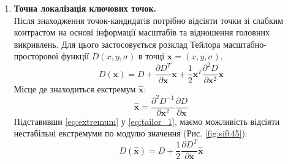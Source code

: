 \begin{enumerate}
    \item \textbf{Точна локалізація ключових точок.} \\
          Після знаходження точок-кандидатів потрібно відсіяти точки зі слабким контрастом на основі
          інформації масштабів та відношення головних викривлень. Для цього застосовується розклад
          Тейлора масштабно-просторової функції $D(x,y,\sigma)$ в точці $\textbf{x} = (x,y,\sigma)$.
          \begin{equation}
              D(\textbf{x}) = D + \frac{\partial D^T }{\partial \textbf{x} }\textbf{x} +
              \frac{1}{2}\textbf{x}^T\frac{\partial^2 D}{\partial \textbf{x}^2}\textbf{x}
              \label{eq:tailor_1}
          \end{equation}
          Місце де знаходиться екстремум $\widehat{\textbf{x}}$:
          \begin{equation}
              \widehat{\textbf{x}} = \frac{\partial^2 D^{-1} }{\partial
                  \textbf{x}^2}\frac{\partial D }{\partial \textbf{x}}
              \label{eq:extremum}
          \end{equation}
          Підставивши \ref{eq:extremum} у  \ref{eq:tailor_1}, маємо можливість відсіяти нестабільні
          екстремуми по модулю значення (Рис. \ref{fig:sift45}):
          \begin{equation}
              D(\widehat{\textbf{x}}) = D + \frac{1}{2}\frac{\partial D^{T} }{\partial \textbf{x}}\widehat{\textbf{x}}
          \end{equation}


\end{enumerate}
